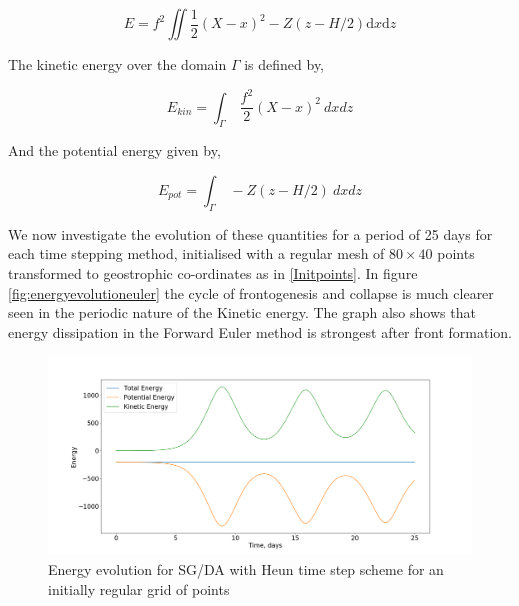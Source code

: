 \begin{equation}
	E= f^2 \iint \frac{1}{2}\left(X-x\right)^2 - Z\left(z - H/2\right)\textrm{d}x\textrm{d}z
\end{equation}

The kinetic energy over the domain $\Gamma$ is defined by,

\begin{equation}
	E_{kin} = \int_\Gamma \ \frac{f^2}{2}(X-x)^2 \ dxdz
\label{KE}
\end{equation}

And the potential energy given by,

\begin{equation}
E_{pot} = \int_\Gamma \ - Z\left(z - H/2\right) \ dxdz
\label{PE}
\end{equation}

We now investigate the evolution of these quantities for a period of 25 days for each time stepping method, initialised with a regular mesh of $80 \times 40$ points transformed to geostrophic co-ordinates as in \ref{Initpoints}.
In figure \ref{fig:energyevolutioneuler} the cycle of frontogenesis and collapse is much clearer seen in the periodic nature of the Kinetic energy. The graph also shows that energy dissipation in the Forward Euler method is strongest after front formation.

\begin{figure}[h!]
	\centering
	\includegraphics[width=0.8\linewidth]{evaluation/Energy_evolution_heun}
	\caption[Energy evolution for SG/DA with Heun time step scheme]{Energy evolution for SG/DA with Heun time step scheme for an initially regular grid of points}
	\label{fig:energyevolutionheun}
\end{figure}

